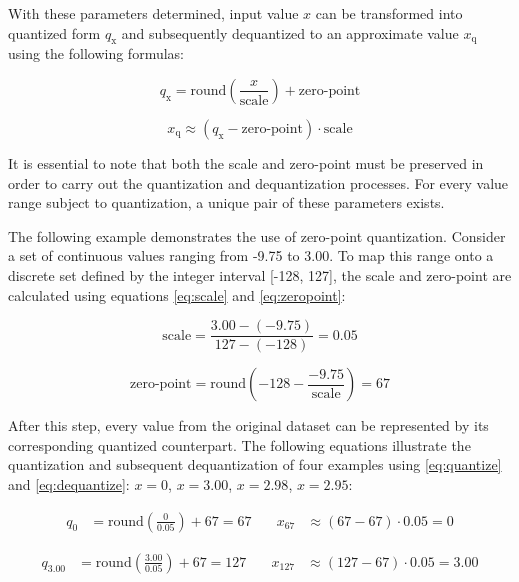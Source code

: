{With these parameters determined,
input value \( x \) can be transformed into quantized form \( q_{\text{x}} \) and subsequently dequantized to an approximate value \( x_{\text{q}} \) using the following formulas:

\begin{equation}
q_{\text{x}} = \text{round}\left(\frac{x}{\text{scale}} \right) + \text{zero-point}
\label{eq:quantize}
\end{equation}

\begin{equation}
x_{\text{q}} \approx \left( q_{\text{x}} - \text{zero-point} \right) \cdot \text{scale}
\label{eq:dequantize}
\end{equation}

It is essential to note that both the scale and zero-point must be preserved in order to carry out the quantization and dequantization processes.
For every value range subject to quantization, a unique pair of these parameters exists.

The following example demonstrates the use of zero-point quantization. Consider a set of continuous values ranging from -9.75 to 3.00.
To map this range onto a discrete set defined by the integer interval [-128, 127], the scale and zero-point are calculated using equations \ref{eq:scale} and \ref{eq:zeropoint}:

\begin{equation*}
\text{scale} = \frac{3.00 - (-9.75)}{127 - (-128)} = 0.05
\end{equation*}

\begin{equation*}
\text{zero-point} = \text{round}\left( -128 - \frac{-9.75}{\text{scale}} \right) = 67
\end{equation*}


After this step, every value from the original dataset can be represented by its corresponding quantized counterpart.
The following equations illustrate the quantization and subsequent dequantization of four examples using \ref{eq:quantize} and \ref{eq:dequantize}:
\( x = 0 \), \( x = 3.00 \), \( x = 2.98 \), \( x = 2.95 \):

\begin{align*}
q_{0} &= \text{round}\left(\frac{0}{0.05} \right) + 67 = 67
& \quad
x_{67} &\approx \left( 67 - 67 \right) \cdot 0.05 = 0
\end{align*}

\begin{align*}
q_{3.00} &= \text{round}\left(\frac{3.00}{0.05} \right) + 67 = 127
& \quad
x_{127} &\approx \left( 127 - 67 \right) \cdot 0.05 = 3.00
\end{align*}

}
